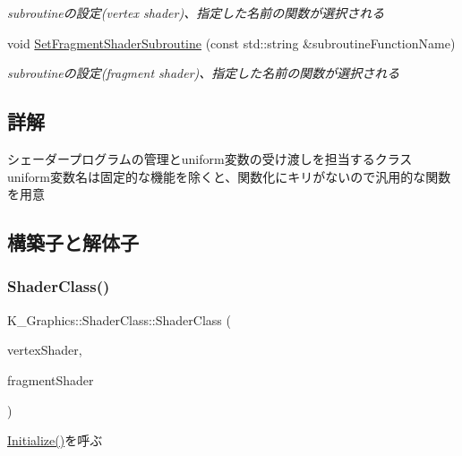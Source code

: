 \begin{DoxyCompactItemize}
\begin{DoxyCompactList}\small\item\em subroutineの設定(vertex shader)、指定した名前の関数が選択される \end{DoxyCompactList}\item 
void \mbox{\hyperlink{class_k___graphics_1_1_shader_class_a8c25bbb391c95061db4d593679c96933}{Set\+Fragment\+Shader\+Subroutine}} (const std\+::string \&subroutine\+Function\+Name)
\begin{DoxyCompactList}\small\item\em subroutineの設定(fragment shader)、指定した名前の関数が選択される \end{DoxyCompactList}\end{DoxyCompactItemize}


\subsection{詳解}
シェーダープログラムの管理とuniform変数の受け渡しを担当するクラス uniform変数名は固定的な機能を除くと、関数化にキリがないので汎用的な関数を用意 

\subsection{構築子と解体子}
\mbox{\label{class_k___graphics_1_1_shader_class_a3762d1f3d62a5b9fe6b37d36aeb8dd51}} 
\subsubsection{\texorpdfstring{Shader\+Class()}{ShaderClass()}}
{\footnotesize\ttfamily K\+\_\+\+Graphics\+::\+Shader\+Class\+::\+Shader\+Class (\begin{DoxyParamCaption}\item[{G\+Luint}]{vertex\+Shader,  }\item[{G\+Luint}]{fragment\+Shader }\end{DoxyParamCaption})}



\mbox{\hyperlink{class_k___graphics_1_1_shader_class_ac37343a738ce216a5f1f3fb501de79ed}{Initialize()}}を呼ぶ 

\mbox{\label{class_k___graphics_1_1_shader_class_ad007e6356bf230f441fd39a5127b76d7}} 

